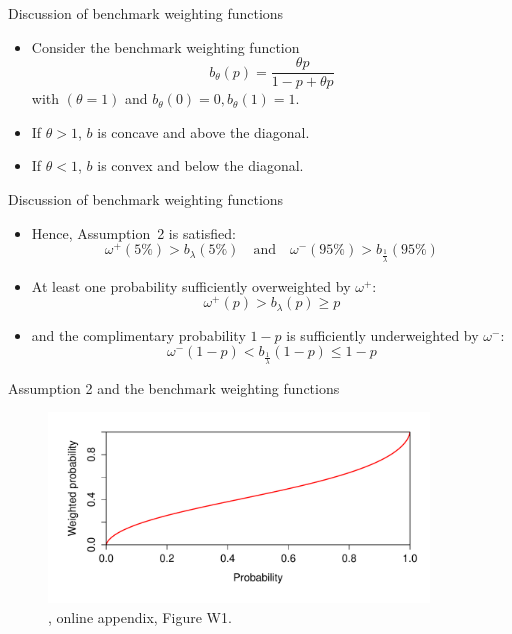 \begin{frame}{Discussion of benchmark weighting functions}
    \begin{itemize}
        \item Consider the benchmark weighting function \[b_\theta (p)=\frac{\theta p}{1-p+\theta p}\]
        with $(\theta=1)$ and $b_\theta(0)=0, b_\theta(1)=1$.\medskip
        \item If $\theta>1$, $b$ is concave and above the diagonal.\medskip
        \item If $\theta<1$, $b$ is convex and below the diagonal.\medskip
	\end{itemize}
\end{frame}



\begin{frame}{Discussion of benchmark weighting functions}
    \begin{itemize}
        \item Hence, Assumption~2 is satisfied: \[\omega ^{+}(5\%)> b_\lambda(5\%) \quad \text{and} \quad \omega ^{-}(95\%)> b_\frac{1}{\lambda}(95\%)\]
        \item At least one probability sufficiently overweighted by $\omega^+$: \[\omega^+(p)>b_{\lambda}(p) \geq p\]
        \item and the complimentary probability $1-p$ is sufficiently underweighted by $\omega^- :$
        \[\omega^-(1-p) < b_{\frac{1}{\lambda}}(1-p) \leq 1-p\]
	\end{itemize}
\end{frame}

\begin{frame}{Assumption 2 and the benchmark weighting functions}
    \begin{figure}
        \centering
        \includegraphics[width = 0.9\textwidth]{decomposition_distortions1}
        \caption{\citet{EbertStrack2015}, online appendix, Figure W1.}
    \end{figure}
\end{frame}

